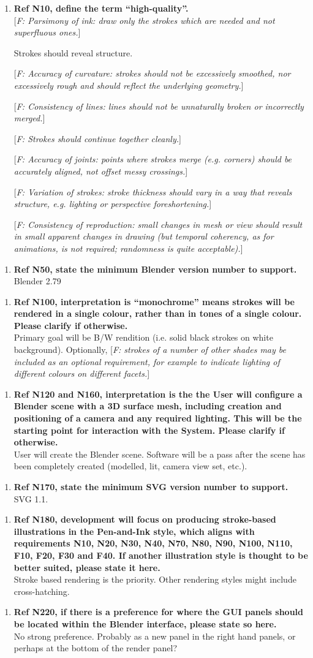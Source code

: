 \documentclass[a4paper,10pt]{article}
\newcommand{\freq}[1]{
    [\textit{F\arabic{fReqNum}: #1}]%
    \addtocounter{fReqNum}{10}%
}
\newcommand{\Qq}[1]{\textbf{#1}}
\newcommand{\Qitemclar}[2][]{
\begin{enumerate}[topsep=2pt,leftmargin=2.8em]
\item[\textit{C\arabic{clarNum}#1.}] #2
\addtocounter{clarNum}{10}
\end{enumerate}
}
\begin{document}
\Qitemclar{\Qq{Ref N10, define the term ``high-quality''.} \\
\freq{Parsimony of ink: draw only the strokes which are needed and not superfluous ones.} 
Strokes should reveal structure.

\freq{Accuracy of curvature: strokes should not be excessively smoothed, nor excessively rough and should reflect the underlying geometry.}

\freq{Consistency of lines: lines should not be unnaturally broken or incorrectly merged.} 
\freq{Strokes should continue together cleanly.}

\freq{Accuracy of joints: points where strokes merge (e.g. corners) should be accurately aligned, not offset messy crossings.}

\freq{Variation of strokes: stroke thickness should vary in a way that reveals structure, e.g. lighting or perspective foreshortening.}

\freq{Consistency of reproduction: small changes in mesh or view should result in small apparent changes in drawing (but temporal coherency, as for animations, is not required; randomness is quite acceptable).}
}
\Qitemclar{\Qq{Ref N50, state the minimum Blender version number to support.} \\
Blender 2.79
}
\Qitemclar{\Qq{Ref N100, interpretation is ``monochrome'' means strokes will be rendered in a single colour, rather than in tones of a single colour. Please clarify if otherwise.} \\
Primary goal will be B/W rendition (i.e. solid black strokes on white background).
Optionally, \freq{strokes of a number of other shades may be included as an optional requirement, for example to indicate lighting of different colours on different facets.}
}
\Qitemclar{\Qq{Ref N120 and N160, interpretation is the the User will configure a Blender scene with a 3D surface mesh, including creation and positioning of a camera and any required lighting. This will be the starting point for interaction with the System. Please clarify if otherwise.} \\
User will create the Blender scene. Software will be a pass after the scene has been completely created (modelled, lit, camera view set, etc.).
}
\Qitemclar{\Qq{Ref N170, state the minimum SVG version number to support.} \\
SVG 1.1.
}
\Qitemclar{\Qq{Ref N180, development will focus on producing stroke-based illustrations in the Pen-and-Ink style, which aligns with requirements N10, N20, N30, N40, N70, N80, N90, N100, N110, F10, F20, F30 and F40. If another illustration style is thought to be better suited, please state it here.} \\
Stroke based rendering is the priority. 
Other rendering styles might include cross-hatching.
}
\Qitemclar{\Qq{Ref N220, if there is a preference for where the GUI panels should be located within the Blender interface, please state so here.} \\
No strong preference. 
Probably as a new panel in the right hand panels, or perhaps at the bottom of the render panel?
}
\end{document}
